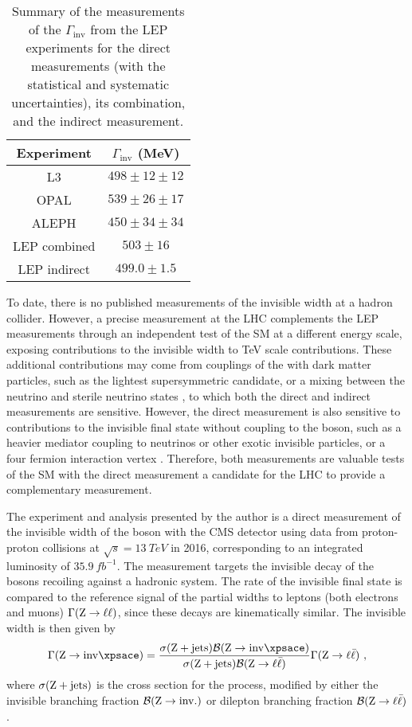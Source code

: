 \begin{table}[htb]
    \centering
    \begin{tabular}{cc}
         \hline\hline
         Experiment & $\Gamma_{\mathrm{inv}}$ (MeV) \\
         \hline
         L3 & $498\pm 12\pm 12$ \\
         OPAL & $539\pm 26\pm 17$ \\
         ALEPH & $450\pm 34\pm 34$ \\
         LEP combined & $503\pm 16$ \\
         \hline
         LEP indirect & $499.0\pm 1.5$ \\
         \hline
    \end{tabular}
    \caption{
        Summary of the measurements of the $\Gamma_{\mathrm{inv}}$ from the LEP experiments for the direct measurements (with the statistical and systematic uncertainties), its combination, and the indirect measurement.
    }
    \label{tab:lep-zinv-width}
\end{table}

To date, there is no published measurements of the \PZ invisible width at a
hadron collider. However, a precise measurement at the LHC complements the LEP
measurements through an independent test of the SM at a different energy
scale, exposing contributions to the invisible width to TeV scale
contributions. These additional contributions may come from couplings of the
\PZ with dark matter particles, such as the lightest supersymmetric candidate,
or a mixing between the neutrino and sterile neutrino states
\cite{Carena:2003aj}, to which both the direct and indirect measurements are
sensitive. However, the direct measurement is also sensitive to
contributions to the invisible final state without coupling to the \PZ boson,
such as a heavier mediator coupling to neutrinos or other exotic invisible
particles, or a four fermion interaction vertex \cite{Carena:2003aj}.
Therefore, both measurements are valuable tests of the SM with the direct
measurement a candidate for the LHC to provide a complementary measurement.

The experiment and analysis presented by the author is a direct measurement of
the invisible width of the \PZ boson with the CMS detector using data from
proton-proton collisions at ${\sqrt{s}=\SI{13}{TeV}}$ in 2016, corresponding
to an integrated luminosity of $\SI{35.9}{fb^{-1}}$. The measurement targets
the invisible decay of the \PZ bosons recoiling against a hadronic system. The
rate of the invisible final state is compared to the reference signal of the
partial widths to leptons (both electrons and muons) $\Gamma(\mathrm{Z}\rightarrow\ell\ell)$, since these decays are
kinematically similar. The invisible width is then given by
%
\begin{equation}\label{eq:zinv}
    \Gamma(\IZinv) = \frac{\sigma(\IZj)\mathcal{B}(\IZinv)}{\sigma(\IZj)\mathcal{B}(\IZll)}\Gamma(\IZll)\ ,
\end{equation}
%
where $\sigma({\mathrm{Z}+\mathrm{jets}})$ is the cross section for the \IZj process, modified by
either the invisible branching fraction $\mathcal{B}(\mathrm{Z}\rightarrow\mathrm{inv.})$ or
dilepton branching fraction $\mathcal{B}({\mathrm{Z}\rightarrow \ell\bar{\ell}})$.